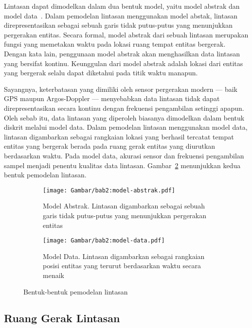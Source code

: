 Lintasan dapat dimodelkan dalam dua bentuk model, yaitu model abstrak dan model data~\cite{wiratma:trajectory}. Dalam pemodelan lintasan menggunakan model abstak, lintasan direpresentasikan sebagai sebuah garis tidak putus-putus yang menunjukkan pergerakan entitas. Secara formal, model abstrak dari sebuah lintasan merupakan fungsi yang memetakan waktu pada lokasi ruang tempat entitas bergerak. Dengan kata lain, penggunaan model abstrak akan menghasilkan data lintasan yang bersifat kontinu. Keunggulan dari model abstrak adalah lokasi dari entitas yang bergerak selalu dapat diketahui pada titik waktu manapun. 

Sayangnya, keterbatasan yang dimiliki oleh sensor pergerakan modern --- baik GPS maupun Argos-Doppler --- menyebabkan data lintasan tidak dapat direpresentasikan secara kontinu dengan frekuensi pengambilan setinggi apapun. Oleh sebab itu, data lintasan yang diperoleh biasanya dimodelkan dalam bentuk diskrit melalui model data. Dalam pemodelan lintasan menggunakan model data, lintasan digambarkan sebagai rangkaian lokasi yang berhasil tercatat tempat entitas yang bergerak berada pada ruang gerak entitas yang diurutkan berdasarkan waktu. Pada model data, akurasi sensor dan frekuensi pengambilan sampel menjadi penentu kualitas data lintasan. Gambar~\ref{bab2:pemodelan-lintasan} menunjukkan kedua bentuk pemodelan lintasan.

\begin{figure}[t]
    \centering
    \begin{subfigure}[b]{0.375\textwidth}
        \centering
        \texttt{[image: Gambar/bab2:model-abstrak.pdf]}
        \caption{Model Abstrak. Lintasan digambarkan sebagai sebuah garis tidak putus-putus yang menunjukkan pergerakan entitas}
        \label{bab2:model-abstrak}
    \end{subfigure} \hspace{1.25cm}
    \begin{subfigure}[b]{0.375\textwidth}
        \centering
        \texttt{[image: Gambar/bab2:model-data.pdf]}
        \caption{Model Data. Lintasan digambarkan sebagai rangkaian posisi entitas yang terurut berdasarkan waktu secara menaik}
    \end{subfigure}
    \caption{Bentuk-bentuk pemodelan lintasan}
    \label{bab2:pemodelan-lintasan}
\end{figure}

\subsection{Ruang Gerak Lintasan}
\label{subsec:ruang}

